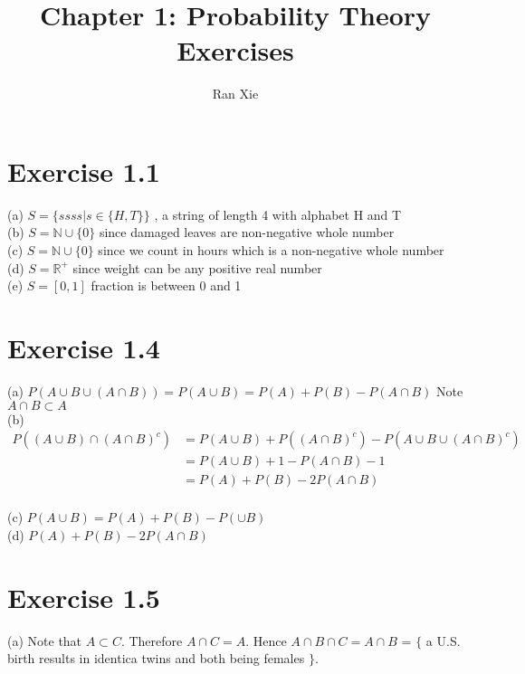 \documentclass[12pt]{article}
\title{Chapter 1: Probability Theory Exercises}
\author{Ran Xie}
\begin{document}
\maketitle

\section*{Exercise 1.1}
(a) $S=\{ ssss | s \in \{H, T\} \}$ , a string of length 4 with alphabet H and T \\

(b) $S=\mathbb{N}\cup\{0\}$ since damaged leaves are non-negative whole number\\

(c) $S=\mathbb{N}\cup\{0\}$ since we count in hours which is a non-negative whole number \\

(d) $S=\mathbb{R}^+$ since weight can be any positive real number \\

(e) $S= [0,1]$ fraction is between 0 and 1 \\


\section*{Exercise 1.4}
(a) $P(A\cup B \cup(A \cap B)) = P(A \cup B) = P(A) + P(B) - P(A \cap B)$  Note $A\cap B \subset A$ \\

(b) $$\begin{aligned}
P((A \cup B)\cap (A \cap B)^c) &= P(A\cup B) + P((A \cap B)^c) - P(A\cup B \cup (A \cap B)^c) \\
&= P(A\cup B) + 1 - P(A \cap B) - 1 \\
&= P(A) + P(B) - 2P(A\cap B) \\
\end{aligned}$$

(c) $P(A\cup B) = P(A) + P(B) - P(\cup B)$ \\

(d) $P(A) + P(B) - 2P(A\cap B)$ \\

\section*{Exercise 1.5}
(a) Note that $A \subset C$. Therefore $A \cap C = A$. Hence $A\cap B \cap C = A \cap B$ = 
$\{$ a U.S. birth results in identica twins and both being females $\}$.
\end{document}
